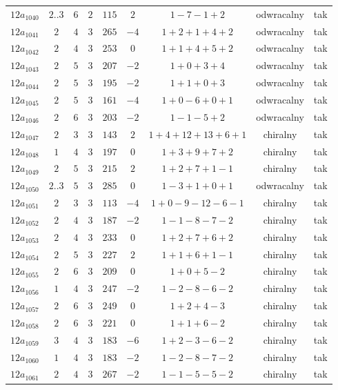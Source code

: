 \begin{longtable}{ccccccccc}
$12a_{1040}$ & $2..3$ & $6$ & $2$ & $115$ & $2$ & $1-7-1+2$ & odwracalny & tak \\
$12a_{1041}$ & $2$ & $4$ & $3$ & $265$ & $-4$ & $1+2+1+4+2$ & odwracalny & tak \\
$12a_{1042}$ & $2$ & $4$ & $3$ & $253$ & $0$ & $1+1+4+5+2$ & odwracalny & tak \\
$12a_{1043}$ & $2$ & $5$ & $3$ & $207$ & $-2$ & $1+0+3+4$ & odwracalny & tak \\
$12a_{1044}$ & $2$ & $5$ & $3$ & $195$ & $-2$ & $1+1+0+3$ & odwracalny & tak \\
$12a_{1045}$ & $2$ & $5$ & $3$ & $161$ & $-4$ & $1+0-6+0+1$ & odwracalny & tak \\
$12a_{1046}$ & $2$ & $6$ & $3$ & $203$ & $-2$ & $1-1-5+2$ & odwracalny & tak \\
$12a_{1047}$ & $2$ & $3$ & $3$ & $143$ & $2$ & $1+4+12+13+6+1$ & chiralny & tak \\
$12a_{1048}$ & $1$ & $4$ & $3$ & $197$ & $0$ & $1+3+9+7+2$ & chiralny & tak \\
$12a_{1049}$ & $2$ & $5$ & $3$ & $215$ & $2$ & $1+2+7+1-1$ & chiralny & tak \\
$12a_{1050}$ & $2..3$ & $5$ & $3$ & $285$ & $0$ & $1-3+1+0+1$ & odwracalny & tak \\
$12a_{1051}$ & $2$ & $3$ & $3$ & $113$ & $-4$ & $1+0-9-12-6-1$ & chiralny & tak \\
$12a_{1052}$ & $2$ & $4$ & $3$ & $187$ & $-2$ & $1-1-8-7-2$ & chiralny & tak \\
$12a_{1053}$ & $2$ & $4$ & $3$ & $233$ & $0$ & $1+2+7+6+2$ & chiralny & tak \\
$12a_{1054}$ & $2$ & $5$ & $3$ & $227$ & $2$ & $1+1+6+1-1$ & chiralny & tak \\
$12a_{1055}$ & $2$ & $6$ & $3$ & $209$ & $0$ & $1+0+5-2$ & chiralny & tak \\
$12a_{1056}$ & $1$ & $4$ & $3$ & $247$ & $-2$ & $1-2-8-6-2$ & chiralny & tak \\
$12a_{1057}$ & $2$ & $6$ & $3$ & $249$ & $0$ & $1+2+4-3$ & chiralny & tak \\
$12a_{1058}$ & $2$ & $6$ & $3$ & $221$ & $0$ & $1+1+6-2$ & chiralny & tak \\
$12a_{1059}$ & $3$ & $4$ & $3$ & $183$ & $-6$ & $1+2-3-6-2$ & chiralny & tak \\
$12a_{1060}$ & $1$ & $4$ & $3$ & $183$ & $-2$ & $1-2-8-7-2$ & chiralny & tak \\
$12a_{1061}$ & $2$ & $4$ & $3$ & $267$ & $-2$ & $1-1-5-5-2$ & chiralny & tak \\

\end{longtable}
